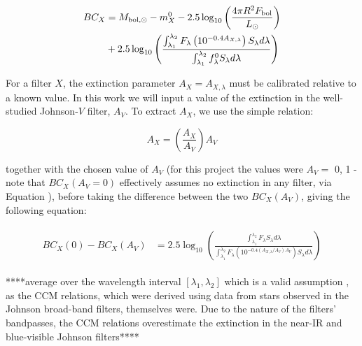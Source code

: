 \documentclass[12pt, a4paper]{report}
\begin{document}
\begin{align}
\begin{split}
BC_{X} &= M_{\textnormal{bol},\odot} - m_{X}^{0} - 2.5 \log_{10} \left( \frac{4\pi R^{2}F_{\textnormal{bol}}}{L_{\odot}} \right) \\
&+ 2.5 \log_{10} \left( \frac{\int_{\lambda_{1}}^{\lambda_{2}} F_{\lambda} \left( 10^{-0.4 A_{X,\lambda}} \right) S_{\lambda} d\lambda}{\int_{\lambda_{1}}^{\lambda_{2}} f_{\lambda}^{0} S_{\lambda} d\lambda} \right)
\label{BC_extinc}
\end{split}
\end{align}

For a filter $X$, the extinction parameter $A_{X} = A_{X,\lambda}$ must be calibrated relative to a known value. In this work we will input a value of the extinction in the well-studied Johnson-$V$ filter, $A_{V}$. To extract $A_{X}$, we use the simple relation:

\begin{equation}
A_{X} = \left( \frac{A_{X}}{A_{V}} \right) A_{V}
\label{ratio_eq}
\end{equation}

together with the chosen value of $A_{V}$ (for this project the values were $A_{V} =$ 0, 1 - note that $BC_{X}(A_{V}=0)$ effectively assumes no extinction in any filter, via Equation ), before taking the difference between the two $BC_{X}(A_{V})$, giving the following equation:

\begin{align}
\begin{split}
BC_{X}(0) - BC_{X}(A_{V}) &= 2.5 \log_{10} \left( \frac{\int_{\lambda_{1}}^{\lambda_{2}} F_{\lambda}  S_{\lambda} d\lambda}{\int_{\lambda_{1}}^{\lambda_{2}} F_{\lambda}\left( 10^{-0.4 \left(A_{X,\lambda}/A_{V}\right)A_{V}} \right) S_{\lambda} d\lambda} \right)
\label{BCs_diff}
\end{split}
\end{align}

****average over the wavelength interval $[\lambda_{1},\lambda_{2}]$ which is a valid assumption \citep{2014MNRAS.444..392C}, as the CCM relations, which were derived using data from stars observed in the Johnson broad-band filters, themselves were. Due to the nature of the filters' bandpasses, the CCM relations overestimate the extinction in the near-IR and blue-visible Johnson filters****
\end{document}

